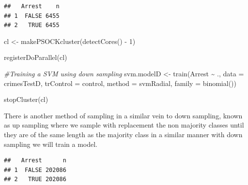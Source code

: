 \documentclass[
]{article}
\newenvironment{Shaded}{\begin{snugshade}}{\end{snugshade}}
\newcommand{\AttributeTok}[1]{\textcolor[rgb]{0.77,0.63,0.00}{#1}}
\newcommand{\CommentTok}[1]{\textcolor[rgb]{0.56,0.35,0.01}{\textit{#1}}}
\newcommand{\DecValTok}[1]{\textcolor[rgb]{0.00,0.00,0.81}{#1}}
\newcommand{\FunctionTok}[1]{\textcolor[rgb]{0.00,0.00,0.00}{#1}}
\newcommand{\NormalTok}[1]{#1}
\newcommand{\OtherTok}[1]{\textcolor[rgb]{0.56,0.35,0.01}{#1}}
\newcommand{\SpecialCharTok}[1]{\textcolor[rgb]{0.00,0.00,0.00}{#1}}
\newcommand{\StringTok}[1]{\textcolor[rgb]{0.31,0.60,0.02}{#1}}
\begin{document}
\begin{verbatim}
##   Arrest    n
## 1  FALSE 6455
## 2   TRUE 6455
\end{verbatim}

\begin{Shaded}
\begin{Highlighting}[]
\NormalTok{cl }\OtherTok{\textless{}{-}} \FunctionTok{makePSOCKcluster}\NormalTok{(}\FunctionTok{detectCores}\NormalTok{() }\SpecialCharTok{{-}} \DecValTok{1}\NormalTok{)}

\FunctionTok{registerDoParallel}\NormalTok{(cl)}

\CommentTok{\#Training a SVM using down sampling}
\NormalTok{svm.modelD }\OtherTok{\textless{}{-}} \FunctionTok{train}\NormalTok{(Arrest }\SpecialCharTok{\textasciitilde{}}\NormalTok{ .,}
                   \AttributeTok{data =}\NormalTok{ crimesTestD,}
                   \AttributeTok{trControl =}\NormalTok{ control,}
                   \AttributeTok{method =} \StringTok{\textquotesingle{}svmRadial\textquotesingle{}}\NormalTok{,}
                   \AttributeTok{family =} \FunctionTok{binomial}\NormalTok{())}

\FunctionTok{stopCluster}\NormalTok{(cl)}
\end{Highlighting}
\end{Shaded}

There is another method of sampling in a similar vein to down sampling,
known as up sampling where we sample with replacement the non majority
classes until they are of the same length as the majority class in a
similar manner with down sampling we will train a model.

\begin{Shaded}
\end{Shaded}

\begin{verbatim}
##   Arrest      n
## 1  FALSE 202086
## 2   TRUE 202086
\end{verbatim}
\end{document}
